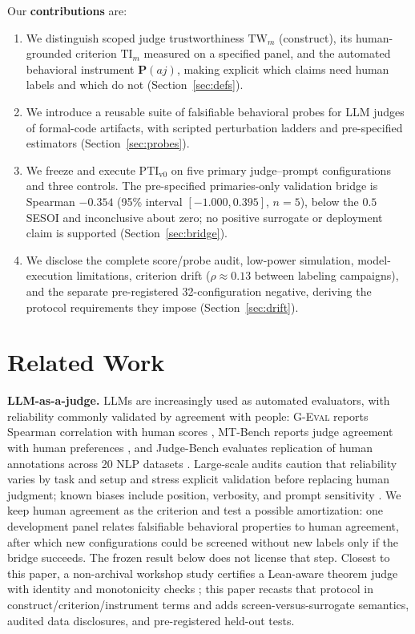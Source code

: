 \documentclass{article}
\newcommand{\TW}{\mathrm{TW}}                    %
\newcommand{\TI}{\mathrm{TI}}                    %
\newcommand{\PTI}{\mathrm{PTI}}                  %
\newcommand{\PTIvzero}{\PTI_{\mathrm{v0}}}        %
\begin{document}
Our \textbf{contributions} are:
\begin{enumerate}
  \item We distinguish scoped judge trustworthiness $\TW_m$ (construct), its human-grounded criterion $\TI_m$ measured on a specified panel, and the automated behavioral instrument $\mathbf{P}(aj)$, making explicit which claims need human labels and which do not (Section~\ref{sec:defs}).
  \item We introduce a reusable suite of falsifiable behavioral probes for LLM judges of formal-code artifacts, with scripted perturbation ladders and pre-specified estimators (Section~\ref{sec:probes}).
  \item We freeze and execute $\PTIvzero$ on five primary judge--prompt configurations and three controls. The pre-specified primaries-only validation bridge is Spearman $-0.354$ (95\% interval $[-1.000,0.395]$, $n{=}5$), below the $0.5$ SESOI and inconclusive about zero; no positive surrogate or deployment claim is supported (Section~\ref{sec:bridge}).
  \item We disclose the complete score/probe audit, low-power simulation, model-execution limitations, criterion drift ($\rho\approx0.13$ between labeling campaigns), and the separate pre-registered 32-configuration negative, deriving the protocol requirements they impose (Section~\ref{sec:drift}).
\end{enumerate}

\section{Related Work}\label{sec:related}
\textbf{LLM-as-a-judge.}
LLMs are increasingly used as automated evaluators, with reliability commonly validated by agreement with people: \textsc{G-Eval} reports Spearman correlation with human scores \citep{Liu2023GEval}, MT-Bench reports judge agreement with human preferences \citep{Zheng2023MTBench}, and Judge-Bench evaluates replication of human annotations across 20 NLP datasets \citep{Kocmi2024HumanVsLLM}.
Large-scale audits caution that reliability varies by task and setup and stress explicit validation before replacing human judgment; known biases include position, verbosity, and prompt sensitivity \citep{Kocmi2024HumanVsLLM,Li2024TrustLLMJudgments,Zheng2023MTBench}.
We keep human agreement as the criterion and test a possible amortization: one development panel relates falsifiable behavioral properties to human agreement, after which new configurations could be screened without new labels only if the bridge succeeds. The frozen result below does not license that step.
Closest to this paper, a non-archival workshop study certifies a Lean-aware theorem judge with identity and monotonicity checks \citep{anonymous2025formaljudge}; this paper recasts that protocol in construct/criterion/instrument terms and adds screen-versus-surrogate semantics, audited data disclosures, and pre-registered held-out tests.
\end{document}
